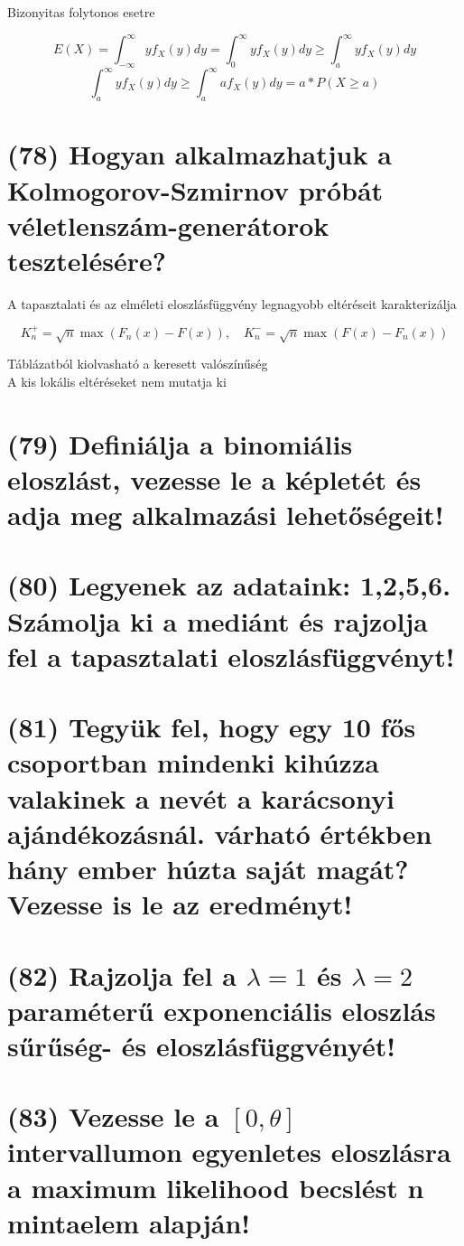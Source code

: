 \documentclass[12p]{article}
\begin{document}
Bizonyitas folytonos esetre

$$E(X) = \int_{-\infty}^{\infty} yf_X(y)dy = \int_{0}^{\infty} yf_X(y)dy \geq \int_{a}^{\infty} yf_X(y)dy$$
$$\int_{a}^{\infty}yf_X(y)dy \geq \int_{a}^{\infty} af_X(y)dy = a * P(X \geq a)$$

\section{(78) Hogyan alkalmazhatjuk a Kolmogorov-Szmirnov próbát véletlenszám-generátorok tesztelésére?}

A tapasztalati és az elméleti eloszlásfüggvény
legnagyobb eltéréseit karakterizálja

$$K_n^{+} = \sqrt{n} \max (F_n(x) - F(x)), \quad K_n^{-}=\sqrt{n} \max(F(x) - F_n(x))$$

Táblázatból kiolvasható a keresett valószínűség\\
A kis lokális eltéréseket nem mutatja ki

\section{(79) Definiálja a binomiális eloszlást, vezesse le a képletét és adja meg alkalmazási lehetőségeit!}

\section{(80) Legyenek az adataink: 1,2,5,6. Számolja ki a mediánt és rajzolja fel a tapasztalati eloszlásfüggvényt!}

\section{(81) Tegyük fel, hogy egy 10 fős csoportban mindenki kihúzza valakinek a nevét a karácsonyi ajándékozásnál. várható értékben hány ember húzta saját magát? Vezesse is le az eredményt!}

\section{(82) Rajzolja fel a $\lambda = 1$ és $\lambda = 2$ paraméterű exponenciális eloszlás sűrűség- és eloszlásfüggvényét!}

\section{(83) Vezesse le a $[0, \theta]$ intervallumon egyenletes eloszlásra a maximum likelihood becslést n mintaelem alapján!}
\end{document}
